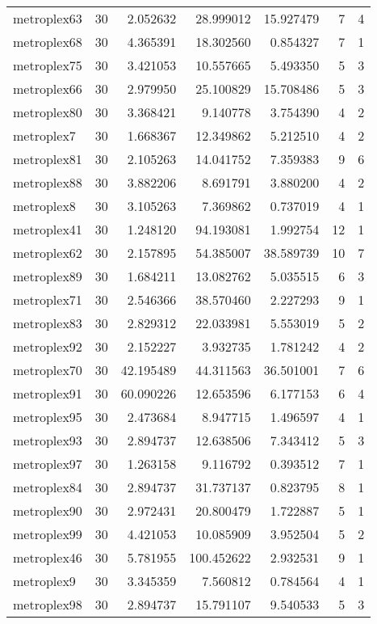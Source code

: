 \begin{longtable}{|l|r|r|r|r|r|r|}
metroplex63 & 30 & 2.052632 & 28.999012 & 15.927479 & 7 & 4 \\
metroplex68 & 30 & 4.365391 & 18.302560 & 0.854327 & 7 & 1 \\
metroplex75 & 30 & 3.421053 & 10.557665 & 5.493350 & 5 & 3 \\
metroplex66 & 30 & 2.979950 & 25.100829 & 15.708486 & 5 & 3 \\
metroplex80 & 30 & 3.368421 & 9.140778 & 3.754390 & 4 & 2 \\
metroplex7 & 30 & 1.668367 & 12.349862 & 5.212510 & 4 & 2 \\
metroplex81 & 30 & 2.105263 & 14.041752 & 7.359383 & 9 & 6 \\
metroplex88 & 30 & 3.882206 & 8.691791 & 3.880200 & 4 & 2 \\
metroplex8 & 30 & 3.105263 & 7.369862 & 0.737019 & 4 & 1 \\
metroplex41 & 30 & 1.248120 & 94.193081 & 1.992754 & 12 & 1 \\
metroplex62 & 30 & 2.157895 & 54.385007 & 38.589739 & 10 & 7 \\
metroplex89 & 30 & 1.684211 & 13.082762 & 5.035515 & 6 & 3 \\
metroplex71 & 30 & 2.546366 & 38.570460 & 2.227293 & 9 & 1 \\
metroplex83 & 30 & 2.829312 & 22.033981 & 5.553019 & 5 & 2 \\
metroplex92 & 30 & 2.152227 & 3.932735 & 1.781242 & 4 & 2 \\
metroplex70 & 30 & 42.195489 & 44.311563 & 36.501001 & 7 & 6 \\
metroplex91 & 30 & 60.090226 & 12.653596 & 6.177153 & 6 & 4 \\
metroplex95 & 30 & 2.473684 & 8.947715 & 1.496597 & 4 & 1 \\
metroplex93 & 30 & 2.894737 & 12.638506 & 7.343412 & 5 & 3 \\
metroplex97 & 30 & 1.263158 & 9.116792 & 0.393512 & 7 & 1 \\
metroplex84 & 30 & 2.894737 & 31.737137 & 0.823795 & 8 & 1 \\
metroplex90 & 30 & 2.972431 & 20.800479 & 1.722887 & 5 & 1 \\
metroplex99 & 30 & 4.421053 & 10.085909 & 3.952504 & 5 & 2 \\
metroplex46 & 30 & 5.781955 & 100.452622 & 2.932531 & 9 & 1 \\
metroplex9 & 30 & 3.345359 & 7.560812 & 0.784564 & 4 & 1 \\
metroplex98 & 30 & 2.894737 & 15.791107 & 9.540533 & 5 & 3 \\

\end{longtable}
